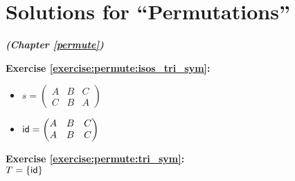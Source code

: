 
\section{Solutions for ``Permutations''}
\noindent\textbf{\textit{ (Chapter \ref{permute})}}\bigskip


\noindent\textbf{Exercise \ref{exercise:permute:isos_tri_sym}:}
\begin{multicols}{2}
\begin{itemize}
\item
$s = \begin{pmatrix}
A & B & C\\
C & B & A
\end{pmatrix}$

\item
$\sf{id} = \begin{pmatrix}
A & B & C \\
A & B & C
\end{pmatrix}$
\end{itemize}
\end{multicols}

\noindent\textbf{Exercise \ref{exercise:permute:tri_sym}:}\\
$T = \{\sf{id}\}$\\
\\

